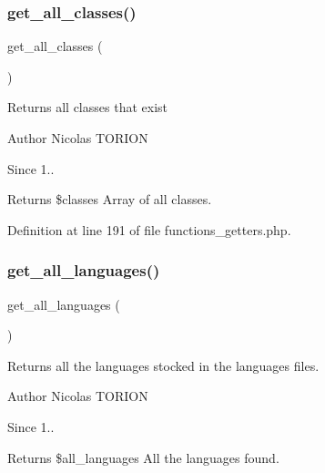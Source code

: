 \mbox{\label{functions__getters_8php_a1d3aea28087a0dfb5fa9b30d3daddadd}} 
\subsubsection{\texorpdfstring{get\+\_\+all\+\_\+classes()}{get\_all\_classes()}}
{\footnotesize\ttfamily get\+\_\+all\+\_\+classes (\begin{DoxyParamCaption}{ }\end{DoxyParamCaption})}

Returns all classes that exist

\begin{DoxyAuthor}{Author}
Nicolas T\+O\+R\+I\+ON 
\end{DoxyAuthor}
\begin{DoxySince}{Since}
1.. 
\end{DoxySince}
\begin{DoxyReturn}{Returns}
\$classes Array of all classes. 
\end{DoxyReturn}


Definition at line 191 of file functions\+\_\+getters.\+php.

\mbox{\label{functions__getters_8php_aba7804caab456cdfd18f0f16c3b46d5d}} 
\subsubsection{\texorpdfstring{get\+\_\+all\+\_\+languages()}{get\_all\_languages()}}
{\footnotesize\ttfamily get\+\_\+all\+\_\+languages (\begin{DoxyParamCaption}{ }\end{DoxyParamCaption})}

Returns all the languages stocked in the languages files.

\begin{DoxyAuthor}{Author}
Nicolas T\+O\+R\+I\+ON 
\end{DoxyAuthor}
\begin{DoxySince}{Since}
1.. 
\end{DoxySince}
\begin{DoxyReturn}{Returns}
\$all\+\_\+languages All the languages found. 
\end{DoxyReturn}


